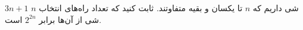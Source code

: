 \EXERCISE
$3n + 1$
شی داریم که
$n$
تا یکسان و بقیه متفاوتند. ثابت کنید که تعداد راه‌های انتخاب
$n$
شی از آن‌ها برابر
$2^{2n}$
است.